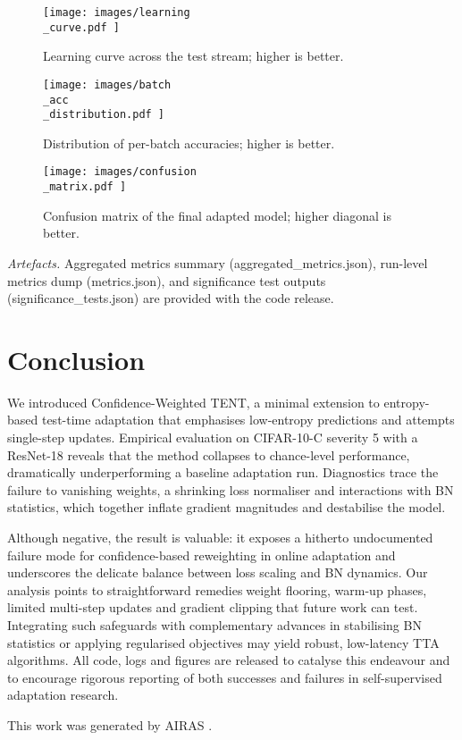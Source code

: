 \documentclass{article} %
\begin{document}
\begin{figure}[H]
  \centering
  \texttt{[image:  images/learning\\\_curve.pdf ]}
  \caption{Learning curve across the test stream; higher is better.}
\end{figure}

\begin{figure}[H]
  \centering
  \texttt{[image:  images/batch\\\_acc\\\_distribution.pdf ]}
  \caption{Distribution of per-batch accuracies; higher is better.}
\end{figure}

\begin{figure}[H]
  \centering
  \texttt{[image:  images/confusion\\\_matrix.pdf ]}
  \caption{Confusion matrix of the final adapted model; higher diagonal is better.}
\end{figure}

\textit{Artefacts.} Aggregated metrics summary (aggregated\_metrics.json), run-level metrics dump (metrics.json), and significance test outputs (significance\_tests.json) are provided with the code release.

\section{Conclusion}
\label{sec:conclusion}
We introduced Confidence-Weighted TENT, a minimal extension to entropy-based test-time adaptation that emphasises low-entropy predictions and attempts single-step updates. Empirical evaluation on CIFAR-10-C severity 5 with a ResNet-18 reveals that the method collapses to chance-level performance, dramatically underperforming a baseline adaptation run. Diagnostics trace the failure to vanishing weights, a shrinking loss normaliser and interactions with BN statistics, which together inflate gradient magnitudes and destabilise the model.

Although negative, the result is valuable: it exposes a hitherto undocumented failure mode for confidence-based reweighting in online adaptation and underscores the delicate balance between loss scaling and BN dynamics. Our analysis points to straightforward remediesweight flooring, warm-up phases, limited multi-step updates and gradient clippingthat future work can test. Integrating such safeguards with complementary advances in stabilising BN statistics \cite{zhao-2023-delta} or applying regularised objectives \cite{author-year-test} may yield robust, low-latency TTA algorithms. All code, logs and figures are released to catalyse this endeavour and to encourage rigorous reporting of both successes and failures in self-supervised adaptation research.

This work was generated by \textsc{AIRAS} \citep{airas2025}.



\end{document}

